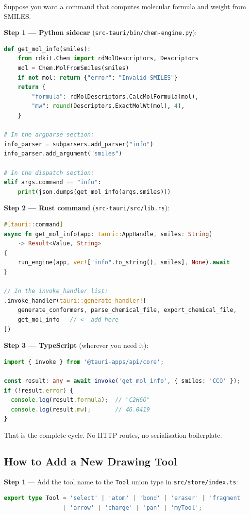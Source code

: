 \documentclass[11pt,a4paper]{article}
\begin{document}
Suppose you want a command that computes molecular formula and weight from SMILES.

\textbf{Step 1 --- Python sidecar} (\texttt{src-tauri/bin/chem-engine.py}):
\begin{lstlisting}[language=Python]
def get_mol_info(smiles):
    from rdkit.Chem import rdMolDescriptors, Descriptors
    mol = Chem.MolFromSmiles(smiles)
    if not mol: return {"error": "Invalid SMILES"}
    return {
        "formula": rdMolDescriptors.CalcMolFormula(mol),
        "mw": round(Descriptors.ExactMolWt(mol), 4),
    }

# In the argparse section:
info_parser = subparsers.add_parser("info")
info_parser.add_argument("smiles")

# In the dispatch section:
elif args.command == "info":
    print(json.dumps(get_mol_info(args.smiles)))
\end{lstlisting}

\textbf{Step 2 --- Rust command} (\texttt{src-tauri/src/lib.rs}):
\begin{lstlisting}[language=Rust]
#[tauri::command]
async fn get_mol_info(app: tauri::AppHandle, smiles: String)
    -> Result<Value, String>
{
    run_engine(app, vec!["info".to_string(), smiles], None).await
}

// In the invoke_handler list:
.invoke_handler(tauri::generate_handler![
    generate_conformers, parse_chemical_file, export_chemical_file,
    get_mol_info   // <- add here
])
\end{lstlisting}

\textbf{Step 3 --- TypeScript} (wherever you need it):
\begin{lstlisting}[language=TypeScript]
import { invoke } from '@tauri-apps/api/core';

const result: any = await invoke('get_mol_info', { smiles: 'CCO' });
if (!result.error) {
  console.log(result.formula);  // "C2H6O"
  console.log(result.mw);       // 46.0419
}
\end{lstlisting}

That is the complete cycle. No HTTP routes, no serialisation boilerplate.

\subsection{How to Add a New Drawing Tool}

\textbf{Step 1} --- Add the tool name to the \lstinline|Tool| union type in
\texttt{src/store/index.ts}:
\begin{lstlisting}[language=TypeScript]
export type Tool = 'select' | 'atom' | 'bond' | 'eraser' | 'fragment'
                 | 'arrow' | 'charge' | 'pan' | 'myTool';
\end{lstlisting}
\end{document}
